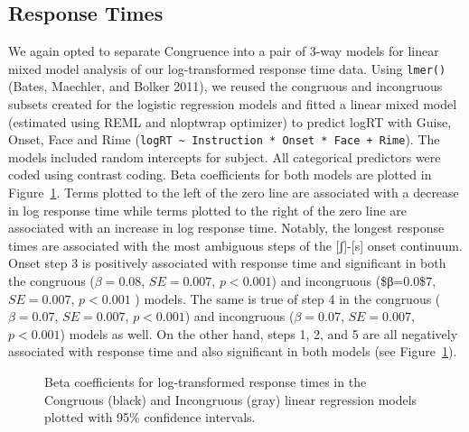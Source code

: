 \documentclass[
  letterpaper,
  DIV=11,
  numbers=noendperiod]{scrartcl}
\begin{document}
\subsection{Response Times}\label{sec-results-rt}

We again opted to separate Congruence into a pair of 3-way models for
linear mixed model analysis of our log-transformed response time data.
Using \texttt{lmer()} (Bates, Maechler, and Bolker 2011), we reused the
congruous and incongruous subsets created for the logistic regression
models and fitted a linear mixed model (estimated using REML and
nloptwrap optimizer) to predict logRT with Guise, Onset, Face and Rime
(\texttt{logRT\ \textasciitilde{}\ Instruction\ *\ Onset\ *\ Face\ +\ Rime}).
The models included random intercepts for subject. All categorical
predictors were coded using contrast coding. Beta coefficients for both
models are plotted in Figure~\ref{fig-coefs-logRT}. Terms plotted to the
left of the zero line are associated with a decrease in log response
time while terms plotted to the right of the zero line are associated
with an increase in log response time. Notably, the longest response
times are associated with the most ambiguous steps of the
{[}ʃ{]}-{[}s{]} onset continuum. Onset step 3 is positively associated
with response time and significant in both the congruous (\(β=0.08\),
\(SE=0.007\), \(p < 0.001\)) and incongruous (\$β=0.0\$7, \(SE=0.007\),
\(p < 0.001\) ) models. The same is true of step 4 in the congruous
(\(β=0.07\), \(SE=0.007\), \(p < 0.001\)) and incongruous (\(β=0.07\),
\(SE=0.007\), \(p < 0.001\)) models as well. On the other hand, steps 1,
2, and 5 are all negatively associated with response time and also
significant in both models (see Figure~\ref{fig-coefs-logRT}).

\begin{figure}


\caption{\label{fig-coefs-logRT}Beta coefficients for log-transformed
response times in the Congruous (black) and Incongruous (gray) linear
regression models plotted with 95\% confidence intervals.}

\end{figure}%
\end{document}
